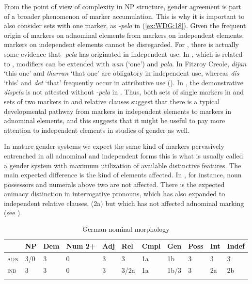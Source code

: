 \documentclass[output=collectionpaper]{langsci/langscibook}
\begin{document}
From the point of view of complexity in NP structure, gender agreement is part of a broader phenomenon of marker accumulation. This is why it is important to also consider sets with one marker, as  \textit{-pela} in (\ref{ex:WDG:18}). Given the frequent origin of markers on adnominal elements from markers on independent elements, markers on independent elements cannot be disregarded. For , there is actually some evidence that \textit{-pela} has originated in independent use. In  , which is related to , modifiers can be extended with \textit{wan} (`one') and \textit{pala}. In Fitzroy  Creole, \textit{dijan} `this one' and \textit{tharran} `that one' are obligatory in independent use, whereas \textit{dis} `this' and \textit{det} `that' frequently occur in attributive use (\citealt[79]{Hudson1985}). In , the demonstrative \textit{dispela} is not attested without \textit{-pela} in \cite{Verhaar1995}. Thus, both sets of single markers in  and sets of two markers in  and  relative clauses suggest that there is a typical developmental pathway from markers in independent elements to markers in adnominal elements, and this suggests that it might be useful to pay more attention to independent elements in studies of gender as well.

In mature gender systems we expect the same kind of markers pervasively entrenched in all adnominal and independent forms \textendash{} this is what is usually called a gender system with maximum utilization of available distinctive features. The main expected difference is the kind of elements affected. In , for instance, noun possessors and numerals above two are not affected. There is the expected animacy distinction in interrogative pronouns, which has also expanded to independent relative clauses, (2a) but which has not affected adnominal marking (see ).


\begin{table}
\begin{tabular}{*{11}{l}}
  \lsptoprule
& NP & Dem & Num 2+ & Adj & Rel & Cmpl & Gen & Poss & Int & Indef \\
\midrule
\textsc{adn} & 3/0 & 3 & 0 & 3 & 3 & 1a & 1b & 3 & 3 & 3 \\
\textsc{ind} & 3 & 3 & 0 & 3 & 3/2a & 1a & 1b/3 & 3 & 2a & 2b \\
\lspbottomrule
\end{tabular}
\caption{German nominal morphology}
\label{tab:WDG:2}
\end{table}
\end{document}
